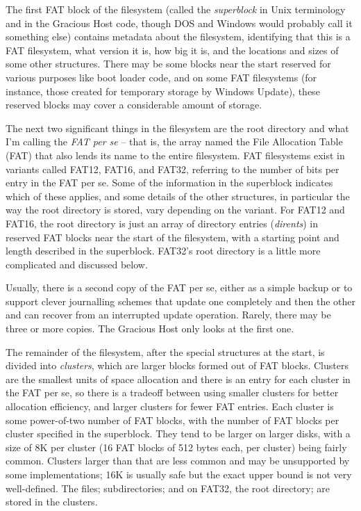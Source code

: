 The first FAT block of the filesystem (called the \emph{superblock} in Unix
terminology and in the Gracious Host code, though DOS and Windows would
probably call it something else) contains metadata about the filesystem,
identifying that this is a FAT filesystem, what version it is, how big it
is, and the locations and sizes of some other structures.  There may be some
blocks near the start reserved for various purposes like boot loader code,
and on some FAT filesystems (for instance, those created for temporary
storage by Windows Update), these reserved blocks may cover a considerable
amount of storage.

The next two significant things in the filesystem are the root directory and
what I'm calling the \emph{FAT per se} -- that is, the array named the File
Allocation Table (FAT) that also lends its name to the entire filesystem. 
FAT filesystems exist in variants called FAT12, FAT16, and FAT32, referring
to the number of bits per entry in the FAT per se.  Some of the information
in the superblock indicates which of these applies, and some details of the
other structures, in particular the way the root directory is stored, vary
depending on the variant.  For FAT12 and FAT16, the root directory is just
an array of directory entries (\emph{dirents}) in reserved FAT blocks near
the start of the filesystem, with a starting point and length described in
the superblock.  FAT32's root directory is a little more complicated and
discussed below.

Usually, there is a second copy of the FAT per se, either as a simple backup
or to support clever journalling schemes that update one completely and then
the other and can recover from an interrupted update operation.  Rarely,
there may be three or more copies.  The Gracious Host only looks at the
first one.

The remainder of the filesystem, after the special structures at the start,
is divided into \emph{clusters}, which are larger blocks formed out of FAT
blocks.  Clusters are the smallest units of space allocation and there is an
entry for each cluster in the FAT per se, so there is a tradeoff between
using smaller clusters for better allocation efficiency, and larger clusters
for fewer FAT entries.  Each cluster is some power-of-two number of FAT
blocks, with the number of FAT blocks per cluster specified in the
superblock.  They tend to be larger on larger disks, with a size of 8K per
cluster (16 FAT blocks of 512 bytes each, per cluster) being fairly common. 
Clusters larger than that are less common and may be unsupported by some
implementations; 16K is usually safe but the exact upper bound is not very
well-defined.  The files; subdirectories; and on FAT32, the root directory;
are stored in the clusters.

